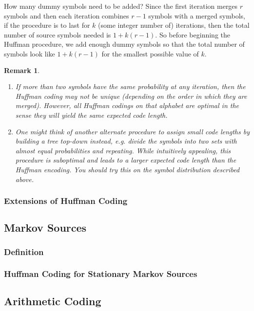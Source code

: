 \documentclass{article}
\newtheorem*{remark}{Remark}
\begin{document}
How many dummy symbols need to be added? Since the first iteration merges $r$ symbols and then each iteration combines $r-1$ symbols with a merged symbols, if the procedure is to last for $k$ (some integer number of) iterations, then the total number of source symbols needed is $1+k(r-1)$. So before beginning the Huffman procedure, we add enough dummy symbols so that the total number of symbols look like $1+k(r-1)$ for the smallest possible value of $k$.

\begin{remark}
	\mbox{}
	\begin{enumerate}
		\item If more than two symbols have the same probability at any iteration, then the Huffman coding may not be unique (depending on the order in which they are merged). However, all Huffman codings on that alphabet are optimal in the sense they will yield the same expected code length.	
		\item 	One might think of another alternate procedure to assign small code lengths by building a tree top-down instead, e.g. divide the symbols into two sets with almost equal probabilities and repeating. While intuitively appealing, this procedure is suboptimal and leads to a larger expected code length than the Huffman encoding. You should try this on the symbol distribution described above.
	\end{enumerate}
\end{remark}

\subsubsection{Extensions of Huffman Coding}

\subsection{Markov Sources}

\subsubsection{Definition}

\subsubsection{Huffman Coding for Stationary Markov Sources}

\subsection{Arithmetic Coding}
\end{document}
